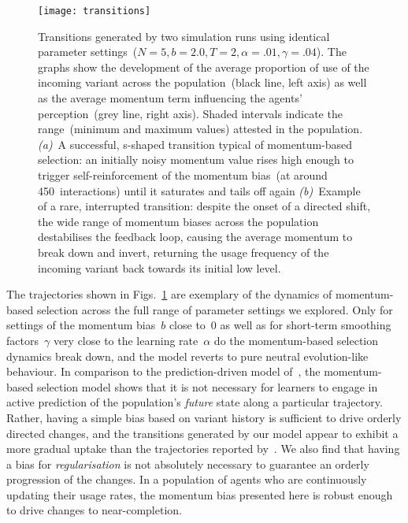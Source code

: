 \documentclass[10pt]{article}
\begin{document}
\begin{figure}
\centering
\texttt{[image: transitions]}
\caption[Successful and unsuccessful transitions generated by two simulation runs using identical parameter settings]{Transitions generated by two simulation runs using identical parameter settings~($N=5, b=2.0, T=2, \alpha=.01, \gamma=.04$). The graphs show the development of the average proportion of use of the incoming variant across the population~(black line, left axis) as well as the average momentum term influencing the agents' perception~(grey line, right axis). Shaded intervals indicate the range~(minimum and maximum values) attested in the population. \textit{(a)}~A successful, s-shaped transition typical of momentum-based selection: an initially noisy momentum value rises high enough to trigger self-reinforcement of the momentum bias~(at around 450~interactions) until it saturates and tails off again \textit{(b)}~Example of a rare, interrupted transition: despite the onset of a directed shift, the wide range of momentum biases across the population destabilises the feedback loop, causing the average momentum to break down and invert, returning the usage frequency of the incoming variant back towards its initial low level.}
\label{fig:transitions}
\end{figure}

The trajectories shown in Figs.~\ref{fig:transitions} are exemplary of the dynamics of momentum-based selection across the full range of parameter settings we explored. Only for settings of the momentum bias~$b$ close to~$0$ as well as for short-term smoothing factors~$\gamma$ very close to the learning rate~$\alpha$ do the momentum-based selection dynamics break down, and the model reverts to pure neutral evolution-like behaviour. In comparison to the prediction-driven model of~\cite{Mitchener2011}, the momentum-based selection model shows that it is not necessary for learners to engage in active prediction of the population's \emph{future} state along a particular trajectory. Rather, having a simple bias based on variant history is sufficient to drive orderly directed changes, and the transitions generated by our model appear to exhibit a more gradual uptake than the trajectories reported by~\citeauthor{Mitchener2011}. We also find that having a bias for \emph{regularisation} is not absolutely necessary to guarantee an orderly progression of the changes. In a population of agents who are continuously updating their usage rates, the momentum bias presented here is robust enough to drive changes to near-completion.
\end{document}
